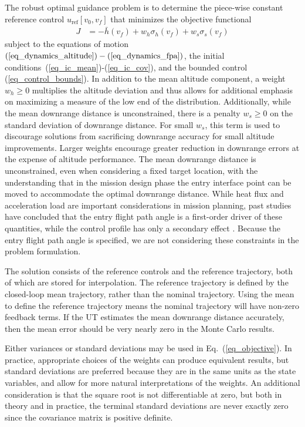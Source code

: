 \documentclass[journal ]{new-aiaa}
\newcommand{\ur}{\ensuremath{u_{\mathrm{ref}}}}
\newcommand{\E}[1]{\mathbb{E}\left[#1\right]}
\newcommand{\V}[1]{\mathbb{V}[#1]}
\begin{document}
The robust optimal guidance problem is to determine the piece-wise constant reference control $\ur\left[v_0,v_f\right]$ that minimizes the objective functional
\begin{align}
J &= -\bar{h}(v_f) + w_h\sigma_h(v_f) + w_s\sigma_s(v_f) \label{eq_objective}
\end{align}
subject to the equations of motion $(\ref{eq_dynamics_altitude})-(\ref{eq_dynamics_fpa})$, the initial conditions~(\ref{eq_ic_mean})-(\ref{eq_ic_cov}), and the bounded control (\ref{eq_control_bounds}). 
In addition to the mean altitude component, a weight $w_h\ge0$ multiplies the altitude deviation and thus allows for additional emphasis on maximizing a measure of the low end of the distribution. Additionally, while the mean downrange distance is unconstrained, there is a penalty $w_s\ge0$ on the standard deviation of downrange distance. For small $w_s$, this term is used to discourage solutions from sacrificing downrange accuracy for small altitude improvements. Larger weights encourage greater reduction in downrange errors at the expense of altitude performance. The mean downrange distance is unconstrained, even when considering a fixed target location, with the understanding that in the mission design phase the entry interface point can be moved to accommodate the optimal downrange distance. While heat flux and acceleration load are important considerations in mission planning, past studies have concluded that the entry flight path angle is a first-order driver of these quantities, while the control profile has only a secondary effect \cite{MSL_EDL2}. Because the entry flight path angle is specified, we are not considering these constraints in the problem formulation. 

The solution consists of the reference controls and the reference trajectory, both of which are stored for interpolation. The reference trajectory is defined by the closed-loop mean trajectory, rather than the nominal trajectory. Using the mean to define the reference trajectory means the nominal trajectory will have non-zero feedback terms. If the UT estimates the mean downrange distance accurately, then the mean error should be very nearly zero in the Monte Carlo results. 

Either variances or standard deviations may be used in Eq.~(\ref{eq_objective}). In practice, appropriate choices of the weights can produce equivalent results, but standard deviations are preferred because they are in the same units as the state variables, and allow for more natural interpretations of the weights. An additional consideration is that the square root is not differentiable at zero, but both in theory and in practice, the terminal standard deviations are never exactly zero since the covariance matrix is positive definite.
\end{document}
